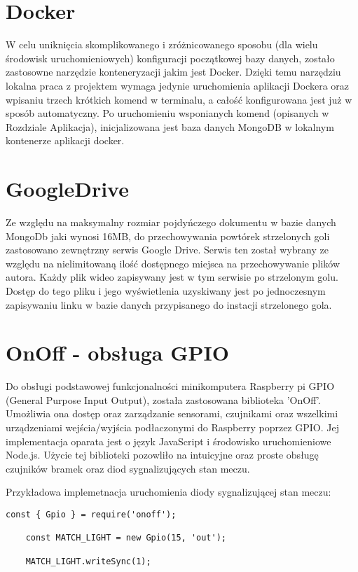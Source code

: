 \section{Docker}
W celu uniknięcia skomplikowanego i zróżnicowanego sposobu (dla wielu środowisk uruchomieniowych) konfiguracji początkowej bazy danych, zostało zastosowne narzędzie konteneryzacji jakim jest Docker. Dzięki temu narzędziu lokalna praca z projektem wymaga jedynie uruchomienia aplikacji Dockera oraz wpisaniu trzech krótkich komend w terminalu, a całość konfigurowana jest już w sposób automatyczny. Po uruchomieniu wsponianych komend (opisanych w Rozdziale Aplikacja), inicjalizowana jest baza danych MongoDB w lokalnym kontenerze aplikacji docker.

\section{GoogleDrive}
Ze względu na maksymalny rozmiar pojdyńczego dokumentu w bazie danych MongoDb jaki wynosi 16MB, do przechowywania powtórek strzelonych goli zastosowano zewnętrzny serwis Google Drive. Serwis ten został wybrany ze względu na nielimitowaną ilość dostępnego miejsca na przechowywanie plików autora. Każdy plik wideo zapisywany jest w tym serwisie po strzelonym golu. Dostęp do tego pliku i jego wyświetlenia uzyskiwany jest po jednoczesnym zapisywaniu linku w bazie danych przypisanego do instacji strzelonego gola.

\section{OnOff - obsługa GPIO}
Do obsługi podstawowej funkcjonalności minikomputera Raspberry pi GPIO (General Purpose Input Output), została zastosowana biblioteka 'OnOff'. Umożliwia ona dostęp oraz zarządzanie sensorami, czujnikami oraz wszelkimi urządzeniami wejścia/wyjścia podłaczonymi do Raspberry poprzez GPIO. Jej implementacja oparata jest o język JavaScript i środowisko uruchomieniowe Node.js. Użycie tej biblioteki pozowliło na intuicyjne oraz proste obsługę czujników bramek oraz diod sygnalizujących stan meczu.

Przykładowa implemetnacja uruchomienia diody sygnalizującej stan meczu:

\begin{lstlisting}[breaklines=true]
    const { Gpio } = require('onoff');

    const MATCH_LIGHT = new Gpio(15, 'out');

    MATCH_LIGHT.writeSync(1);
\end{lstlisting}

